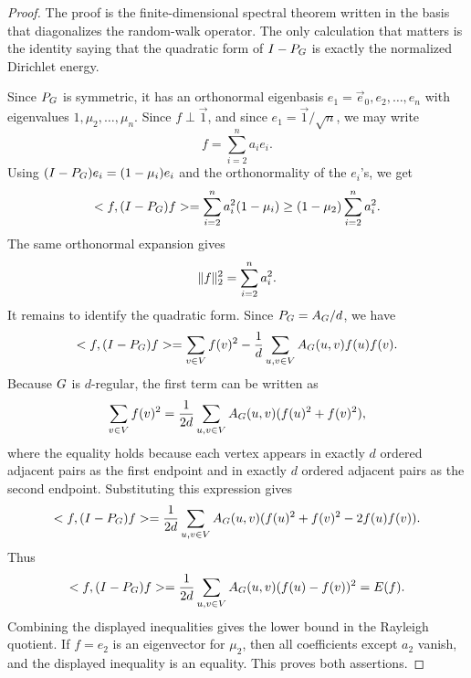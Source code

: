 \begin{proof}
	The proof is the finite-dimensional spectral theorem written in the basis that diagonalizes the random-walk operator. The only calculation that matters is the identity saying that the quadratic form of \(I-P_{G}\) is exactly the normalized Dirichlet energy.

	Since \(P_{G}\) is symmetric, it has an orthonormal eigenbasis \(e_1=\vec{e}_0,e_2,\ldots,e_n\) with eigenvalues \(1,\mu_2,\ldots,\mu_n\). Since \(f\perp\vec{1}\), and since \(e_1=\vec{1}/\sqrt{n}\), we may write
	\begin{equation}
		f=\sum_{i=2}^n a_i e_i.
	\end{equation}
	Using \((I-P_{G})e_i=(1-\mu_i)e_i\) and the orthonormality of the \(e_i\)'s, we get
	\begin{equation}
		< f,(I-P_{G})f>=\sum_{i=2}^n a_i^2(1-\mu_i)\geq (1-\mu_2)\sum_{i=2}^n a_i^2.
	\end{equation}
	The same orthonormal expansion gives
	\begin{equation}
		\lVert f\rVert_2^2=\sum_{i=2}^n a_i^2.
	\end{equation}
	It remains to identify the quadratic form. Since \(P_{G}=A_{G}/d\), we have
	\begin{equation}
		< f,(I-P_{G})f>
		=
		\sum_{v\in V}f(v)^2-\frac{1}{d}\sum_{u,v\in V}A_{G}(u,v)f(u)f(v).
	\end{equation}
	Because \(G\) is \(d\)-regular, the first term can be written as
	\begin{equation}
		\sum_{v\in V}f(v)^2=\frac{1}{2d}\sum_{u,v\in V}A_{G}(u,v)(f(u)^2+f(v)^2),
	\end{equation}
	where the equality holds because each vertex appears in exactly \(d\) ordered adjacent pairs as the first endpoint and in exactly \(d\) ordered adjacent pairs as the second endpoint. Substituting this expression gives
	\begin{equation}
		< f,(I-P_{G})f>
		=
		\frac{1}{2d}\sum_{u,v\in V}A_{G}(u,v)(f(u)^2+f(v)^2-2f(u)f(v)).
	\end{equation}
	Thus
	\begin{equation}
		< f,(I-P_{G})f>
		=
		\frac{1}{2d}\sum_{u,v\in V}A_{G}(u,v)(f(u)-f(v))^2
		=
		E(f).
	\end{equation}
	Combining the displayed inequalities gives the lower bound in the Rayleigh quotient. If \(f=e_2\) is an eigenvector for \(\mu_2\), then all coefficients except \(a_2\) vanish, and the displayed inequality is an equality. This proves both assertions.
\end{proof}

